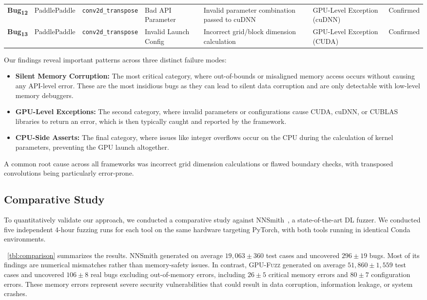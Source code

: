 \begin{table}[htbp]
{\begin{tabular}{@{}lllllll@{}}
\textbf{Bug\textsubscript{12}} & PaddlePaddle & \texttt{conv2d\_transpose} & Bad API Parameter & Invalid parameter combination passed to cuDNN & GPU-Level Exception (cuDNN) & Confirmed \\
\textbf{Bug\textsubscript{13}} & PaddlePaddle & \texttt{conv2d\_transpose} & Invalid Launch Config & Incorrect grid/block dimension calculation & GPU-Level Exception (CUDA) & Confirmed \\
\bottomrule
\end{tabular}
}
\end{table}

Our findings reveal important patterns across three distinct failure modes:
\begin{itemize}[leftmargin=1em]
    \item \textbf{Silent Memory Corruption:} The most critical category, where out-of-bounds or misaligned memory access occurs without causing any API-level error. These are the most insidious bugs as they can lead to silent data corruption and are only detectable with low-level memory debuggers.
    \item \textbf{GPU-Level Exceptions:} The second category, where invalid parameters or configurations cause CUDA, cuDNN, or CUBLAS libraries to return an error, which is then typically caught and reported by the framework.
    \item \textbf{CPU-Side Asserts:} The final category, where issues like integer overflows occur on the CPU during the calculation of kernel parameters, preventing the GPU launch altogether.
\end{itemize}
\noindent A common root cause across all frameworks was incorrect grid dimension calculations or flawed boundary checks, with transposed convolutions being particularly error-prone. 

\subsection{Comparative Study}
\label{sec:comparison}
To quantitatively validate our approach, we conducted a comparative study against NNSmith~\cite{liu2023nnsmith}, a state-of-the-art DL fuzzer. We conducted five independent 4-hour fuzzing runs for each tool on the same hardware targeting PyTorch, with both tools running in identical Conda environments.

\T~\ref{tbl:comparison} summarizes the results. NNSmith generated on average $19{,}063\pm 360$ test cases and uncovered $296\pm 19$ bugs. Most of its findings are numerical mismatches rather than memory-safety issues. In contrast, \textsc{GPU-Fuzz} generated on average $51{,}860\pm 1{,}559$ test cases and uncovered $106\pm 8$ real bugs excluding out-of-memory errors, including $26\pm 5$ critical memory errors and $80\pm 7$ configuration errors. These memory errors represent severe security vulnerabilities that could result in data corruption, information leakage, or system crashes.

